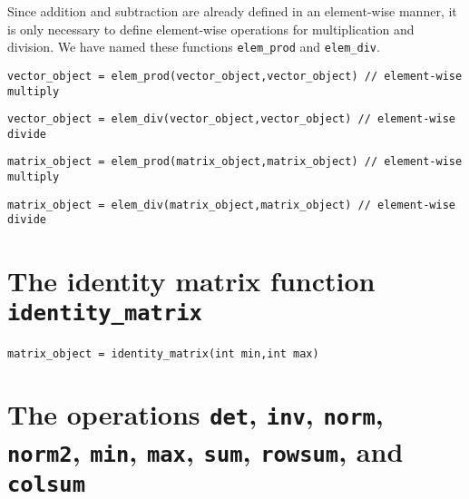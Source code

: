 \documentclass{admbmanual}
\begin{document}
Since addition and subtraction are already defined in an element-wise manner, it
is only necessary to define element-wise operations for multiplication and
division. We have named these functions \texttt{elem\_prod} and
\texttt{elem\_div}.

\begin{lstlisting}
vector_object = elem_prod(vector_object,vector_object) // element-wise multiply
\end{lstlisting}

\begin{lstlisting}
vector_object = elem_div(vector_object,vector_object) // element-wise divide
\end{lstlisting}

\begin{lstlisting}
matrix_object = elem_prod(matrix_object,matrix_object) // element-wise multiply
\end{lstlisting}

\begin{lstlisting}
matrix_object = elem_div(matrix_object,matrix_object) // element-wise divide
\end{lstlisting}

\section{The identity matrix function \texttt{identity\_matrix}}

\begin{lstlisting}
matrix_object = identity_matrix(int min,int max)
\end{lstlisting}

\section{The operations \texttt{det}, \texttt{inv}, \texttt{norm},
  \texttt{norm2}, \br \texttt{min}, \texttt{max}, \texttt{sum}, \texttt{rowsum},
  and \texttt{colsum}}
\end{document}
